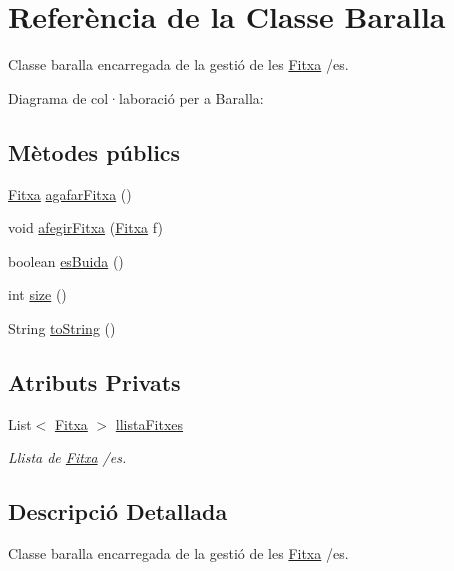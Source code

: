 \hypertarget{class_baralla}{}\section{Referència de la Classe Baralla}
\label{class_baralla}


Classe baralla encarregada de la gestió de les \mbox{\hyperlink{class_fitxa}{Fitxa}} /es.  




Diagrama de col·laboració per a Baralla\+:
\subsection*{Mètodes públics}
\begin{DoxyCompactItemize}
\item 
\mbox{\hyperlink{class_fitxa}{Fitxa}} \mbox{\hyperlink{class_baralla_a08558891cafb3b18b3927fe2a4ac109a}{agafar\+Fitxa}} ()
\item 
void \mbox{\hyperlink{class_baralla_a997d3f37894226927d02bfc4044378f2}{afegir\+Fitxa}} (\mbox{\hyperlink{class_fitxa}{Fitxa}} f)
\item 
boolean \mbox{\hyperlink{class_baralla_ac20fe10e5d263fb9630fd1111f4a9848}{es\+Buida}} ()
\item 
int \mbox{\hyperlink{class_baralla_a9fa8e63f2507d81cee48f249fbb14d82}{size}} ()
\item 
String \mbox{\hyperlink{class_baralla_a8822859a1184ed228be5cd955f7cbb05}{to\+String}} ()
\end{DoxyCompactItemize}
\subsection*{Atributs Privats}
\begin{DoxyCompactItemize}
\item 
List$<$ \mbox{\hyperlink{class_fitxa}{Fitxa}} $>$ \mbox{\hyperlink{class_baralla_a468bd8fbe440f57370538713b5b147fa}{llista\+Fitxes}}
\begin{DoxyCompactList}\small\item\em Llista de \mbox{\hyperlink{class_fitxa}{Fitxa}} /es. \end{DoxyCompactList}\end{DoxyCompactItemize}


\subsection{Descripció Detallada}
Classe baralla encarregada de la gestió de les \mbox{\hyperlink{class_fitxa}{Fitxa}} /es. 

